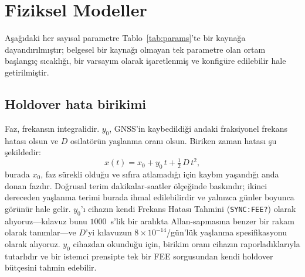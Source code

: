 \documentclass[9pt,twocolumn,a4paper]{extarticle}
\begin{document}
\section{Fiziksel Modeller}
\label{sec:models}
Aşağıdaki her sayısal parametre Tablo~\ref{tab:params}'te bir kaynağa dayandırılmıştır; belgesel bir kaynağı olmayan tek parametre olan ortam başlangıç sıcaklığı, bir varsayım olarak işaretlenmiş ve konfigüre edilebilir hale getirilmiştir.

\subsection{Holdover hata birikimi}
Faz, frekansın integralidir. $y_0$, GNSS'in kaybedildiği andaki fraksiyonel frekans hatası olsun ve $D$ osilatörün yaşlanma oranı olsun. Biriken zaman hatası şu şekildedir:
\begin{equation}
x(t) = x_0 + y_0\,t + \tfrac{1}{2}\,D\,t^{2},
\label{eq:holdover}
\end{equation}
burada $x_0$, faz sürekli olduğu ve sıfıra atlamadığı için kaybın yaşandığı anda donan fazdır. Doğrusal terim dakikalar-saatler ölçeğinde baskındır; ikinci dereceden yaşlanma terimi burada ihmal edilebilirdir ve yalnızca günler boyunca görünür hale gelir. $y_0$'ı cihazın kendi Frekans Hatası Tahmini (\texttt{SYNC:FEE?}) olarak alıyoruz---kılavuz bunu $1000$~s'lik bir aralıkta Allan-sapmasına benzer bir rakam olarak tanımlar---ve $D$'yi kılavuzun $8\times10^{-14}$/gün'lük yaşlanma spesifikasyonu olarak alıyoruz. $y_0$ cihazdan okunduğu için, birikim oranı cihazın raporladıklarıyla tutarlıdır ve bir istemci prensipte tek bir FEE sorgusundan kendi holdover bütçesini tahmin edebilir.
\end{document}
